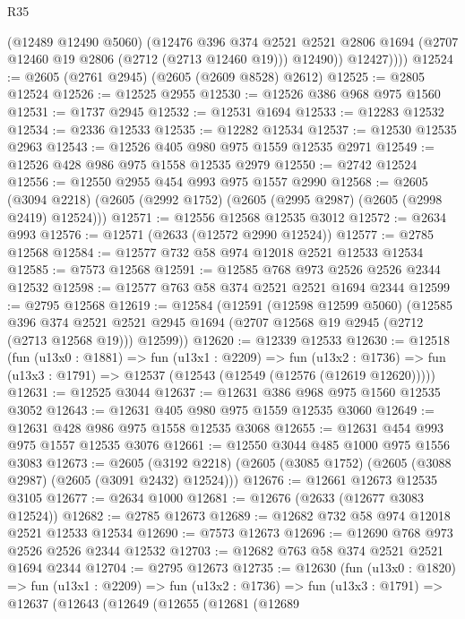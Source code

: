\begin{lexlean}{R35}
\begin{coremodule}
              (@12489 @12490 @5060)
              (@12476
                @396
                @374
                @2521
                @2521
                @2806
                @1694
                (@2707 @12460 @19 @2806 (@2712 (@2713 @12460 @19)))
                @12490))
            @12427))))
@12524 := @2605 (@2761 @2945) (@2605 (@2609 @8528) @2612)
@12525 := @2805 @12524
@12526 := @12525 @2955
@12530 := @12526 @386 @968 @975 @1560
@12531 := @1737 @2945
@12532 := @12531 @1694
@12533 := @12283 @12532
@12534 := @2336 @12533
@12535 := @12282 @12534
@12537 := @12530 @12535 @2963
@12543 := @12526 @405 @980 @975 @1559 @12535 @2971
@12549 := @12526 @428 @986 @975 @1558 @12535 @2979
@12550 := @2742 @12524
@12556 := @12550 @2955 @454 @993 @975 @1557 @2990
@12568 := @2605
    (@3094 @2218)
    (@2605 (@2992 @1752) (@2605 (@2995 @2987) (@2605 (@2998 @2419) @12524)))
@12571 := @12556 @12568 @12535 @3012
@12572 := @2634 @993
@12576 := @12571 (@2633 (@12572 @2990 @12524))
@12577 := @2785 @12568
@12584 := @12577 @732 @58 @974 @12018 @2521 @12533 @12534
@12585 := @7573 @12568
@12591 := @12585 @768 @973 @2526 @2526 @2344 @12532
@12598 := @12577 @763 @58 @374 @2521 @2521 @1694 @2344
@12599 := @2795 @12568
@12619 := @12584
    (@12591
      (@12598 @12599 @5060)
      (@12585
        @396
        @374
        @2521
        @2521
        @2945
        @1694
        (@2707 @12568 @19 @2945 (@2712 (@2713 @12568 @19)))
        @12599))
@12620 := @12339 @12533
@12630 := @12518
    (fun (u13x0 : @1881) =>
    fun (u13x1 : @2209) =>
    fun (u13x2 : @1736) => fun (u13x3 : @1791) => @12537 (@12543 (@12549 (@12576 (@12619 @12620)))))
@12631 := @12525 @3044
@12637 := @12631 @386 @968 @975 @1560 @12535 @3052
@12643 := @12631 @405 @980 @975 @1559 @12535 @3060
@12649 := @12631 @428 @986 @975 @1558 @12535 @3068
@12655 := @12631 @454 @993 @975 @1557 @12535 @3076
@12661 := @12550 @3044 @485 @1000 @975 @1556 @3083
@12673 := @2605
    (@3192 @2218)
    (@2605 (@3085 @1752) (@2605 (@3088 @2987) (@2605 (@3091 @2432) @12524)))
@12676 := @12661 @12673 @12535 @3105
@12677 := @2634 @1000
@12681 := @12676 (@2633 (@12677 @3083 @12524))
@12682 := @2785 @12673
@12689 := @12682 @732 @58 @974 @12018 @2521 @12533 @12534
@12690 := @7573 @12673
@12696 := @12690 @768 @973 @2526 @2526 @2344 @12532
@12703 := @12682 @763 @58 @374 @2521 @2521 @1694 @2344
@12704 := @2795 @12673
@12735 := @12630
    (fun (u13x0 : @1820) =>
    fun (u13x1 : @2209) =>
    fun (u13x2 : @1736) =>
    fun (u13x3 : @1791) =>
    @12637
      (@12643
        (@12649
          (@12655
            (@12681
              (@12689

\end{coremodule}
\end{lexlean}
